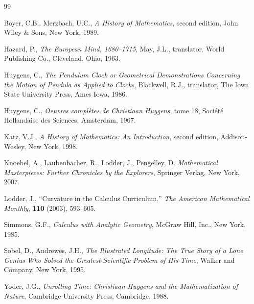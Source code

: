 \documentclass[12pt]{article}
\theoremstyle{definition}
\begin{document}
\begin{thebibliography}{99}

 Boyer, C.B., Merzbach, U.C., {\em A History of
    Mathematics}, second edition, John Wiley \& Sons, New York, 1989.  

 Hazard, P., {\em The European Mind, 1680--1715}, May,
  J.L., translator, World Publishing Co., Cleveland, Ohio, 1963.

 Huygens, C., {\em The Pendulum Clock or
    Geometrical Demonstrations Concerning the Motion of Pendula as
    Applied to Clocks}, Blackwell, R.J., translator, The Iowa State
    University Press, Ames Iowa, 1986.  

 Huygens, C., {\em Oeuvres compl\`etes de Christiaan
    Huygens}, tome 18, Soci\'et\'e Hollandaise des Sciences, Amsterdam, 1967.

 Katz, V.J., {\em A History of Mathematics:  An
    Introduction}, second edition, Addison-Wesley, New York, 1998.  

 Knoebel, A., Laubenbacher, R., Lodder, J.,
  Pengelley, D. {\em Mathematical Masterpieces:  Further Chronicles by
    the Explorers}, Springer Verlag, New York, 2007.  

 Lodder, J., ``Curvature in the Calculus Curriculum,''
  {\em The American Mathematical Monthly}, {\bf{110}} (2003), 593--605.

 Simmons, G.F., {\em Calculus with Analytic
    Geometry}, McGraw Hill, Inc., New York, 1985.

 Sobel, D., Andrewes, J.H., {\em The Illustrated
    Longitude:  The True Story of a Lone Genius Who Solved the
    Greatest Scientific Problem of His Time}, Walker and Company, New
  York, 1995.

 Yoder, J.G., {\em Unrolling Time:  Christiaan Huygens
    and the Mathematization of Nature}, Cambridge University Press,
  Cambridge, 1988.  


\end{thebibliography}
\end{document}
